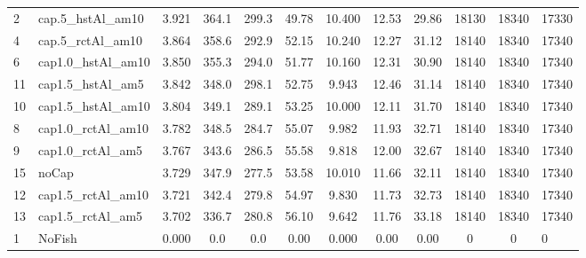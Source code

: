 \documentclass[11pt]{book}
\begin{document}
\begin{landscape}
\begin{longtable}[t]{llcccccccccl}
2 & cap.5\_hstAl\_am10 & 3.921 & 364.1 & 299.3 & 49.78 & 10.400 & 12.53 & 29.86 & 18130 & 18340 & 17330\\
4 & cap.5\_rctAl\_am10 & 3.864 & 358.6 & 292.9 & 52.15 & 10.240 & 12.27 & 31.12 & 18140 & 18340 & 17340\\
6 & cap1.0\_hstAl\_am10 & 3.850 & 355.3 & 294.0 & 51.77 & 10.160 & 12.31 & 30.90 & 18140 & 18340 & 17340\\
11 & cap1.5\_hstAl\_am5 & 3.842 & 348.0 & 298.1 & 52.75 & 9.943 & 12.46 & 31.14 & 18140 & 18340 & 17340\\
10 & cap1.5\_hstAl\_am10 & 3.804 & 349.1 & 289.1 & 53.25 & 10.000 & 12.11 & 31.70 & 18140 & 18340 & 17340\\
8 & cap1.0\_rctAl\_am10 & 3.782 & 348.5 & 284.7 & 55.07 & 9.982 & 11.93 & 32.71 & 18140 & 18340 & 17340\\
9 & cap1.0\_rctAl\_am5 & 3.767 & 343.6 & 286.5 & 55.58 & 9.818 & 12.00 & 32.67 & 18140 & 18340 & 17340\\
15 & noCap & 3.729 & 347.9 & 277.5 & 53.58 & 10.010 & 11.66 & 32.11 & 18140 & 18340 & 17340\\
12 & cap1.5\_rctAl\_am10 & 3.721 & 342.4 & 279.8 & 54.97 & 9.830 & 11.73 & 32.73 & 18140 & 18340 & 17340\\
13 & cap1.5\_rctAl\_am5 & 3.702 & 336.7 & 280.8 & 56.10 & 9.642 & 11.76 & 33.18 & 18140 & 18340 & 17340\\
1 & NoFish & 0.000 & 0.0 & 0.0 & 0.00 & 0.000 & 0.00 & 0.00 & 0 & 0 & 0\\*
\end{longtable}
\end{landscape}
\endgroup{}

\newpage
\end{document}
